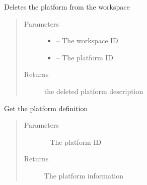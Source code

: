 \documentclass[letterpaper,10pt,english]{sphinxmanual}
\begin{document}

\begin{fulllineitems}
\label{_source/son_editor.impl:son_editor.impl.platformsimpl.delete}
Deletes the platform from the workspace
\begin{quote}\begin{description}
\item[{Parameters}] \leavevmode\begin{itemize}
\item {} 
 -- The workspace ID

\item {} 
 -- The platform ID

\end{itemize}

\item[{Returns}] \leavevmode
the deleted platform description

\end{description}\end{quote}

\end{fulllineitems}


\begin{fulllineitems}
\label{_source/son_editor.impl:son_editor.impl.platformsimpl.get_platform}
Get the platform definition
\begin{quote}\begin{description}
\item[{Parameters}] \leavevmode
{} -- The platform ID

\item[{Returns}] \leavevmode
The platform information

\end{description}\end{quote}

\end{fulllineitems}

\end{document}
